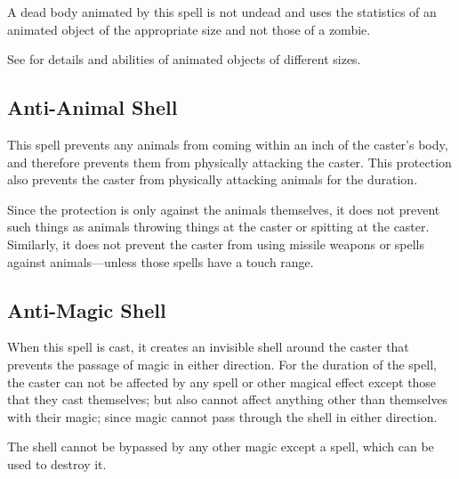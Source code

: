 \begin{multicols*}{2}
A dead body animated by this spell is not undead and uses the statistics of an animated object of the appropriate size and not those of a zombie.

See  for details and abilities of animated objects of different sizes.

\subsection{Anti-Animal Shell}\label{spell:Anti-Animal Shell}

This spell prevents any animals from coming within an inch of the caster’s body, and therefore prevents them from physically attacking the caster. This protection also prevents the caster from physically attacking animals for the duration.

Since the protection is only against the animals themselves, it does not prevent such things as animals throwing things at the caster or spitting at the caster. Similarly, it does not prevent the caster from using missile weapons or spells against animals—unless those spells have a touch range.

\subsection{Anti-Magic Shell}\label{spell:Anti-Magic Shell}

When this spell is cast, it creates an invisible shell around the caster that prevents the passage of magic in either direction. For the duration of the spell, the caster can not be affected by any spell or other magical effect except those that they cast themselves; but also cannot affect anything other than themselves with their magic; since magic cannot pass through the shell in either direction.

The shell cannot be bypassed by any other magic except a  spell, which can be used to destroy it.


\end{multicols*}
